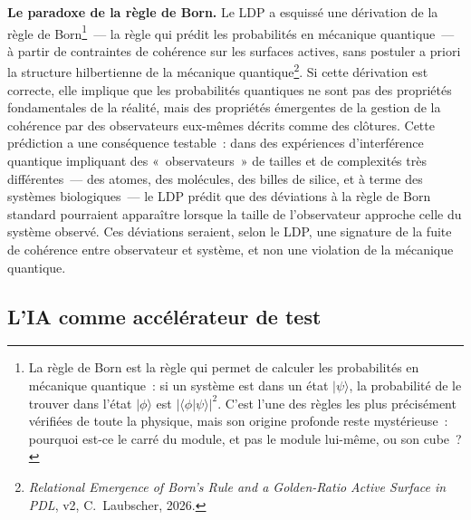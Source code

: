 \documentclass[12pt, a4paper, openright]{book}
\begin{document}
\textbf{Le paradoxe de la règle de Born.} Le LDP a esquissé une dérivation de la règle de Born\footnote{La règle de Born est la règle qui permet de calculer les probabilités en mécanique quantique~: si un système est dans un état $|\psi\rangle$, la probabilité de le trouver dans l'état $|\phi\rangle$ est $|\langle\phi|\psi\rangle|^2$. C'est l'une des règles les plus précisément vérifiées de toute la physique, mais son origine profonde reste mystérieuse~: pourquoi est-ce le carré du module, et pas le module lui-même, ou son cube~?}~--- la règle qui prédit les probabilités en mécanique quantique~--- à partir de contraintes de cohérence sur les surfaces actives, sans postuler a priori la structure hilbertienne de la mécanique quantique\footnote{\textit{Relational Emergence of Born's Rule and a Golden-Ratio Active Surface in PDL}, v2, C.~Laubscher, 2026.}. Si cette dérivation est correcte, elle implique que les probabilités quantiques ne sont pas des propriétés fondamentales de la réalité, mais des propriétés émergentes de la gestion de la cohérence par des observateurs eux-mêmes décrits comme des clôtures. Cette prédiction a une conséquence testable~: dans des expériences d'interférence quantique impliquant des «~observateurs~» de tailles et de complexités très différentes~--- des atomes, des molécules, des billes de silice, et à terme des systèmes biologiques~--- le LDP prédit que des déviations à la règle de Born standard pourraient apparaître lorsque la taille de l'observateur approche celle du système observé. Ces déviations seraient, selon le LDP, une signature de la fuite de cohérence entre observateur et système, et non une violation de la mécanique quantique.

\subsection*{L'IA comme accélérateur de test}
\end{document}

